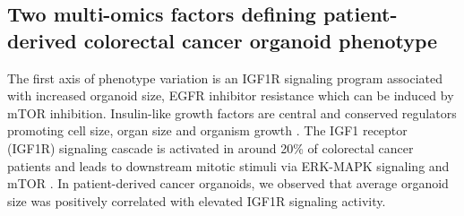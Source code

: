 \begin{flushleft}
\subsection{Two multi-omics factors defining patient-derived colorectal cancer organoid phenotype}

The first axis of phenotype variation is an IGF1R signaling program associated with increased organoid size, EGFR inhibitor resistance which can be induced by mTOR inhibition. Insulin-like growth factors are central and conserved regulators promoting cell size, organ size and organism growth \citep{pucheHumanConditionsInsulinlike2012, sunMechanismCellSize2006}. The IGF1 receptor (IGF1R) signaling cascade is activated in around 20\% of colorectal cancer patients and leads to downstream mitotic stimuli via ERK-MAPK signaling and mTOR \citep{zhongOverproductionIGF2Drives201}. In patient-derived cancer organoids, we observed that average organoid size was positively correlated with elevated IGF1R signaling activity.
\par


\end{flushleft}
